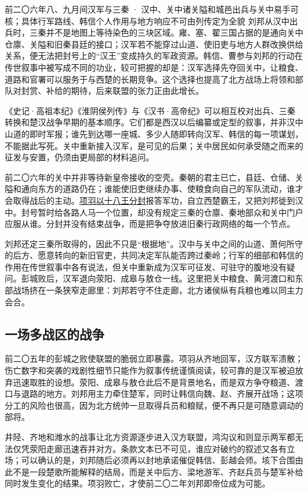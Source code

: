\begin{event}{}{前二〇六年八、九月间}{汉军与三秦 · 汉中、关中诸关隘和城邑}{出兵与关中易手可核；具体行军路线、韩信个人作用与地方响应不可由列传定为全貌}
刘邦从汉中出兵时，三秦并不是地图上等待染色的三块区域。雍、塞、翟三国占据的是通向关中仓廪、关隘和旧秦县廷的接口；汉军若不能穿过山道、使旧吏与地方人群改换供给关系，便无法把封号上的“汉王”变成持久的军政资源。韩信、曹参与刘邦的行动在传世叙事中被写成不同的功业，较可把握的却是：汉军选择先夺回关中，让粮食、道路和官署可以服务于与西楚的长期竞争。这个选择也提高了北方战场上将领和部队对封赏、补给的期待，后来联盟的张力正由此增长。

《史记·高祖本纪》《淮阴侯列传》与《汉书·高帝纪》可以相互校对出兵、三秦转换和楚汉战争早期的基本顺序。它们都是西汉以后编纂或定型的叙事，并非汉中山道的即时军报；谁先到达哪一座城、多少人随即转向汉军、韩信的每一项谋划，不能据此写死。关中重新接入汉军，是可见的后果；关中居民如何承受随之而来的征发与安置，仍须由更局部的材料追问。
\end{event}

前二〇六年的关中并非等待新皇帝接收的空壳。秦朝的君主已亡，县廷、仓储、关隘和通向东方的道路仍在；谁能使旧吏继续办事、使粮食向自己的军队流动，谁才会取得战后的主动。\hyperlink{evt:WH-0206-EIGHTEEN-KINGS}{项羽以十八王分封}报答军功，自立西楚霸王，又把刘邦徙到汉中。封号暂时给各路人马一个位置，却没有规定三秦的仓廪、秦地部众和关中门户应服从谁。分封并没有结束战争，而是把争夺放进旧秦行政网络的每一个节点。

刘邦还定三秦所取得的，因此不只是“根据地”。汉中与关中之间的山道、萧何所守的后方、愿意转向的新旧官吏，共同决定军队能否跨过秦岭；行军的细部和韩信的作用在传世叙事中各有说法，但关中重新成为汉军可征发、可驻守的腹地没有疑问。彭城败后，汉军退向荥阳、成皋与敖仓一线。这里把关中粮食、黄河渡口和东部战场挤在一条狭窄走廊里：刘邦若守不住走廊，北方诸侯纵有兵粮也难以同主力会合。

\subsection{一场多战区的战争}

前二〇五年的彭城之败使联盟的脆弱立即暴露。项羽从齐地回军，汉方联军溃散；伤亡数字和突袭的戏剧性细节只能作为叙事传统谨慎阅读，较可靠的是汉军被迫放弃迅速取胜的设想。荥阳、成皋与敖仓此后不是背景地名，而是双方争夺粮道、渡口与退路的地方。刘邦用主力牵住楚军，同时让韩信向魏、赵、齐展开战场；这项分工的风险也很高，因为北方统帅一旦取得兵员和粮赋，便不再只是可随意调动的部将。

井陉、齐地和潍水的战事让北方资源逐步进入汉方联盟，鸿沟议和则显示两军都无法仅凭荥阳走廊迅速吞并对方。条款文本已不可见，谁应对破约的叙述又各有立场；可以确认的是，刘邦随后必须再以封地承诺催促韩信、彭越会师。垓下合围由此不是一段楚歌所能解释的结局，而是关中后方、梁地游军、齐赵兵员与楚军补给同时发生变化的结果。项羽败亡，才使前二〇二年刘邦即帝位成为可能。

